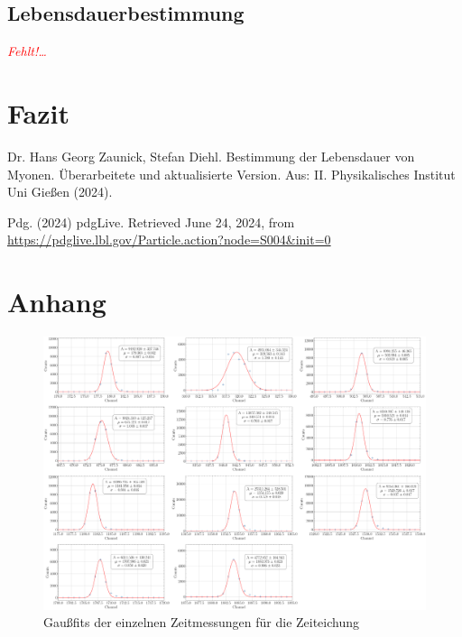 \documentclass[12pt,a4paper,ngerman]{report}
\providecommand{\fehlt}{\textcolor{red}{\emph{Fehlt!\dots}}}
\begin{document}
		
	\section{Lebensdauerbestimmung}
		\fehlt


\chapter{Fazit}

	\listoffigures
	
	\begin{thebibliography}{111} %
		Dr. Hans Georg Zaunick, Stefan Diehl. \glqq Bestimmung der Lebensdauer von Myonen\grqq. Überarbeitete und aktualisierte Version. Aus: II. Physikalisches Institut
		Uni Gießen (2024).
		
		Pdg. (2024) pdgLive. Retrieved June 24, 2024, from \url{https://pdglive.lbl.gov/Particle.action?node=S004&init=0}
		
		
		
	\end{thebibliography}


\chapter*{Anhang} \label{ch:Anhang}
\FloatBarrier
	\begin{figure}[ht]
	\centering
	\includegraphics[width=\textwidth]{Bilder/timeGaussFits.pdf}		
	\caption[Übersicht der Gaußfits]{Gaußfits der einzelnen Zeitmessungen für die Zeiteichung}
	\label{img:TimeGauss}
\end{figure}
\end{document}
